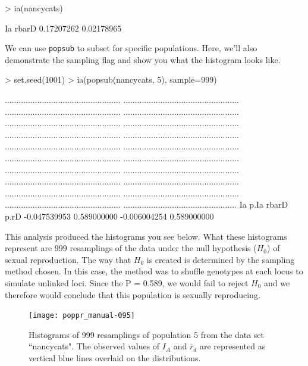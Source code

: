 \documentclass[letterpaper]{article}
\begin{document}
\begin{Schunk}
\begin{Sinput}
> ia(nancycats)
\end{Sinput}
\begin{Soutput}
        Ia      rbarD 
0.17207262 0.02178965 
\end{Soutput}
\end{Schunk}
We can use \texttt{popsub} to subset for specific populations. Here, we'll also demonstrate the sampling flag and show you what the histogram looks like.
\begin{Schunk}
\begin{Sinput}
> set.seed(1001)
> ia(popsub(nancycats, 5), sample=999)
\end{Sinput}
\end{Schunk}
\begin{Schunk}
\begin{Soutput}
..................................................
..................................................
..................................................
..................................................
..................................................
..................................................
..................................................
..................................................
..................................................
..................................................
..................................................
..................................................
..................................................
..................................................
..................................................
..................................................
..................................................
..................................................
..................................................
.................................................
          Ia         p.Ia        rbarD         p.rD 
-0.047539953  0.589000000 -0.006004254  0.589000000 
\end{Soutput}
\end{Schunk}

This analysis produced the histograms you see below. What these histograms represent are 999 resamplings of the data under the null hypothesis ($H_0$) of sexual reproduction. The way that $H_0$ is created is determined by the sampling method chosen. In this case, the method was to shuffle genotypes at each locus to simulate unlinked loci. Since the P = 0.589, we would fail to reject $H_0$ and we therefore would conclude that this population is sexually reproducing. \cite{Brown:1980} \cite{Smith:1993} \cite{Agapow:2001}
\begin{figure}[h!]
  \centering
  \caption{Histograms of 999 resamplings of population 5 from the data set ``nancycats". The observed values of $I_A$ and $\bar r_d$ are represented as vertical blue lines overlaid on the distributions.}
  \label{ia_demo_fig}
\texttt{[image: poppr\_manual-095]}
\end{figure}
\newpage
\end{document}
